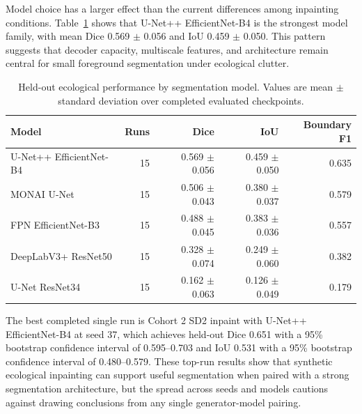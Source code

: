 \documentclass{article}
\begin{document}
Model choice has a larger effect than the current differences among inpainting conditions. Table~\ref{tab:c2-model-results} shows that U-Net++ EfficientNet-B4 is the strongest model family, with mean Dice 0.569 $\pm$ 0.056 and IoU 0.459 $\pm$ 0.050. This pattern suggests that decoder capacity, multiscale features, and architecture remain central for small foreground segmentation under ecological clutter.

\begin{table}[H]
  \centering
  \caption{Held-out ecological performance by segmentation model. Values are mean $\pm$ standard deviation over completed evaluated checkpoints.}
  \label{tab:c2-model-results}
  \begin{tabular}{lrrrr}
    \toprule
    \textbf{Model} & \textbf{Runs} & \textbf{Dice} & \textbf{IoU} & \textbf{Boundary F1} \\
    \midrule
    U-Net++ EfficientNet-B4 & 15 & 0.569 $\pm$ 0.056 & 0.459 $\pm$ 0.050 & 0.635 \\
    MONAI U-Net & 15 & 0.506 $\pm$ 0.043 & 0.380 $\pm$ 0.037 & 0.579 \\
    FPN EfficientNet-B3 & 15 & 0.488 $\pm$ 0.045 & 0.383 $\pm$ 0.036 & 0.557 \\
    DeepLabV3+ ResNet50 & 15 & 0.328 $\pm$ 0.074 & 0.249 $\pm$ 0.060 & 0.382 \\
    U-Net ResNet34 & 15 & 0.162 $\pm$ 0.063 & 0.126 $\pm$ 0.049 & 0.179 \\
    \bottomrule
  \end{tabular}
\end{table}

The best completed single run is Cohort 2 SD2 inpaint with U-Net++ EfficientNet-B4 at seed 37, which achieves held-out Dice 0.651 with a 95\% bootstrap confidence interval of 0.595--0.703 and IoU 0.531 with a 95\% bootstrap confidence interval of 0.480--0.579. These top-run results show that synthetic ecological inpainting can support useful segmentation when paired with a strong segmentation architecture, but the spread across seeds and models cautions against drawing conclusions from any single generator-model pairing.
\end{document}
